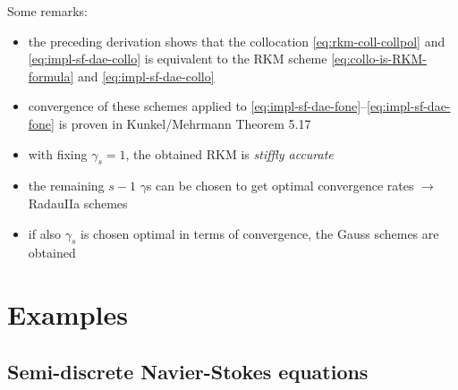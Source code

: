 \documentclass[]{book}
\providecommand{\tightlist}{%
  \setlength{\itemsep}{0pt}\setlength{\parskip}{0pt}}
\theoremstyle{definition}
\theoremstyle{definition}
\theoremstyle{definition}
\theoremstyle{remark}
\begin{document}
Some remarks:

\begin{itemize}
\tightlist
\item
  the preceding derivation shows that the collocation \eqref{eq:rkm-coll-collpol} and \eqref{eq:impl-sf-dae-collo} is equivalent to the RKM scheme \eqref{eq:collo-is-RKM-formula} and \eqref{eq:impl-sf-dae-collo}
\item
  convergence of these schemes applied to \eqref{eq:impl-sf-dae-fone}--\eqref{eq:impl-sf-dae-fone} is proven in Kunkel/Mehrmann Theorem 5.17
\item
  with fixing \(\gamma_s=1\), the obtained RKM is \emph{stiffly accurate}
\item
  the remaining \(s-1\) \(\gamma\)s can be chosen to get optimal convergence rates \(\rightarrow\) RadauIIa schemes
\item
  if also \(\gamma_s\) is chosen optimal in terms of convergence, the Gauss schemes are obtained
\end{itemize}

\hypertarget{examples-1}{%
\chapter{Examples}\label{examples-1}}

\hypertarget{semi-discrete-navier-stokes-equations}{%
\section{Semi-discrete Navier-Stokes equations}\label{semi-discrete-navier-stokes-equations}}
\end{document}
